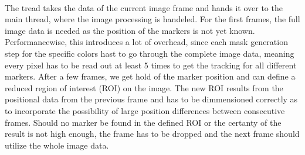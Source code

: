 \\The tread takes the data of the current image frame and hands it over to the main thread, where the image processing is handeled. For the first frames, the full image data is needed as the position of the markers is not yet known. Performancewise, this introduces a lot of overhead, since each mask generation step for the specific colors hast to go through the complete image data, meaning every pixel has to be read out at least 5 times to get the tracking for all different markers. After a few frames, we get hold of the marker position and can define a reduced region of interest (ROI) on the image. The new ROI results from the positional data from the previous frame and has to be dimmensioned correctly as to incorporate the possibility of large position differences between consecutive frames. Should no marker be found in the defined ROI or the certanty of the result is not high enough, the frame has to be dropped and the next frame should utilize the whole image data.
